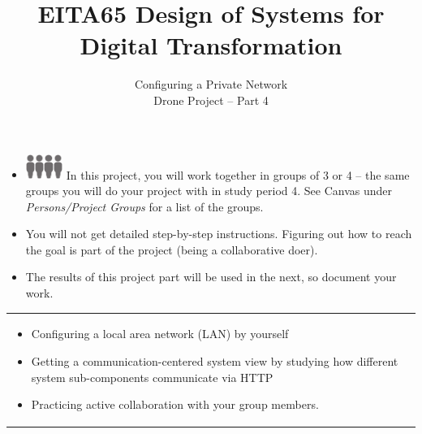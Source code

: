 \documentclass{article}
\title{EITA65 Design of Systems for Digital Transformation\\\year}
\author{\huge Configuring a Private Network\\Drone Project -- Part 4}
\begin{document}
\clearpage\maketitle
\thispagestyle{empty}%

\begin{itemize}
\item \includegraphics[width=3mm]{person.png}\includegraphics[width=3mm]{person.png}\includegraphics[width=3mm]{person.png}\includegraphics[width=3mm]{person.png} In this project, you will work together in groups  of 3 or 4 -- the same groups you will do your project with in study period 4. See Canvas under \emph{Persons/Project Groups} for a list of the groups.
\item You will not get detailed step-by-step instructions. Figuring out how to reach the goal is part of the project (being a collaborative doer).
\item The results of this project part will be used in the next, so document your work.
\end{itemize}

\vspace{.1cm}
\begin{center}
\begin{tabular}{l}
\toprule[1.5pt]
\parbox{0.8\linewidth}{
\vspace{.2cm}{\Large Learning goals:}
\begin{itemize}
    \item Configuring a local area network (LAN) by yourself
    \item Getting a communication-centered system view by studying how different system sub-components communicate via HTTP
    \item Practicing active collaboration with your group members.
\end{itemize}}\\
\bottomrule[1.5pt]
\end{tabular}
\end{center}
\vfill
\vspace{2cm}
\end{document}
